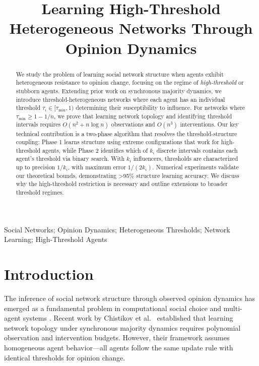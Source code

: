 \documentclass[conference]{IEEEtran}
\begin{document}
\title{Learning High-Threshold Heterogeneous Networks Through Opinion Dynamics}

\author{
}

\maketitle

\begin{abstract}
We study the problem of learning social network structure when agents exhibit heterogeneous resistance to opinion change, focusing on the regime of \emph{high-threshold} or stubborn agents. Extending prior work on synchronous majority dynamics, we introduce threshold-heterogeneous networks where each agent has an individual threshold $\tau_i \in [\tau_{\min}, 1)$ determining their susceptibility to influence. For networks where $\tau_{\min} \geq 1 - 1/n$, we prove that learning network topology and identifying threshold intervals requires $O(n^2 + n \log n)$ observations and $O(n^3)$ interventions. Our key technical contribution is a two-phase algorithm that resolves the threshold-structure coupling: Phase 1 learns structure using extreme configurations that work for high-threshold agents, while Phase 2 identifies which of $k_i$ discrete intervals contains each agent's threshold via binary search. With $k_i$ influencers, thresholds are characterized up to precision $1/k_i$, with maximum error $1/(2k_i)$. Numerical experiments validate our theoretical bounds, demonstrating >95\% structure learning accuracy. We discuss why the high-threshold restriction is necessary and outline extensions to broader threshold regimes.
\end{abstract}

\begin{IEEEkeywords}
Social Networks; Opinion Dynamics; Heterogeneous Thresholds; Network Learning; High-Threshold Agents
\end{IEEEkeywords}

\section{Introduction}
\label{sec:introduction}

The inference of social network structure through observed opinion dynamics has emerged as a fundamental problem in computational social choice and multi-agent systems \cite{kempe2003maximizing,netrapalli2012learning}. Recent work by Chistikov et al.~\cite{chistikov2020convergence} established that learning network topology under synchronous majority dynamics requires polynomial observation and intervention budgets. However, their framework assumes homogeneous agent behavior—all agents follow the same update rule with identical thresholds for opinion change.
\end{document}
